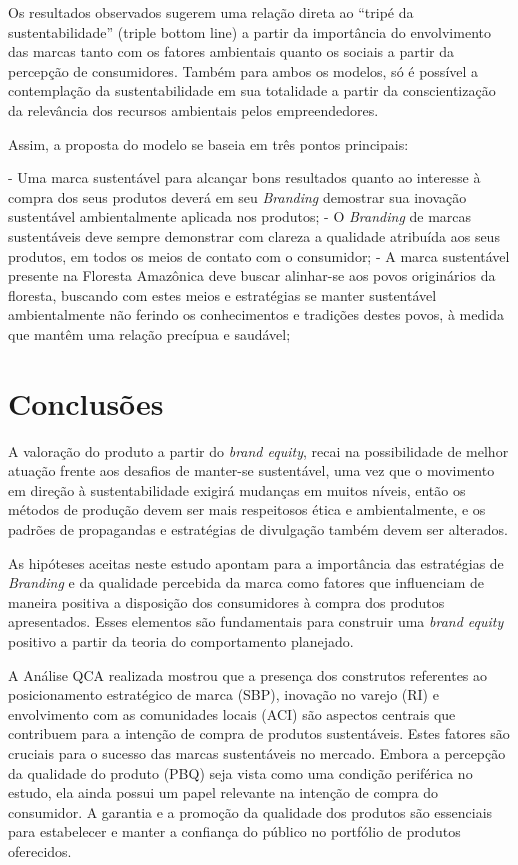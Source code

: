 Os resultados observados sugerem uma relação direta ao “tripé da sustentabilidade” (triple bottom line) a partir da importância do envolvimento das marcas tanto com os fatores ambientais quanto os sociais a partir da percepção de consumidores. Também para ambos os modelos, só é possível a contemplação da sustentabilidade em sua totalidade a partir da conscientização da relevância dos recursos ambientais pelos empreendedores.

Assim, a proposta do modelo se baseia em três pontos principais: 

\begin{enumerate}[label=(\roman*)]
- Uma marca sustentável para alcançar bons resultados quanto ao interesse à compra dos seus produtos deverá em seu \textit{Branding} demostrar sua inovação sustentável ambientalmente aplicada nos produtos;
- O \textit{Branding} de marcas sustentáveis deve sempre demonstrar com clareza a qualidade atribuída aos seus produtos, em todos os meios de contato com o consumidor;
- A marca sustentável presente na Floresta Amazônica deve buscar alinhar-se aos povos originários da floresta, buscando com estes meios e estratégias se manter sustentável ambientalmente não ferindo os conhecimentos e tradições destes povos, à medida que mantêm uma relação precípua e saudável;
\end{enumerate}

\section{Conclusões}

A valoração do produto a partir do \textit{brand equity}, recai na possibilidade de melhor atuação frente aos desafios de manter-se sustentável, uma vez que o movimento em direção à sustentabilidade exigirá mudanças em muitos níveis, então os métodos de produção devem ser mais respeitosos ética e ambientalmente, e os padrões de propagandas e estratégias de divulgação também devem ser alterados.

As hipóteses aceitas neste estudo apontam para a importância das estratégias de \textit{Branding} e da qualidade percebida da marca como fatores que influenciam de maneira positiva a disposição dos consumidores à compra dos produtos apresentados. Esses elementos são fundamentais para construir uma \textit{brand equity} positivo a partir da teoria do comportamento planejado.

A Análise QCA realizada mostrou que a presença dos construtos referentes ao posicionamento estratégico de marca (SBP), inovação no varejo (RI) e envolvimento com as comunidades locais (ACI) são aspectos centrais que contribuem para a intenção de compra de produtos sustentáveis. Estes fatores são cruciais para o sucesso das marcas sustentáveis no mercado. Embora a percepção da qualidade do produto (PBQ) seja vista como uma condição periférica no estudo, ela ainda possui um papel relevante na intenção de compra do consumidor. A garantia e a promoção da qualidade dos produtos são essenciais para estabelecer e manter a confiança do público no portfólio de produtos oferecidos.

